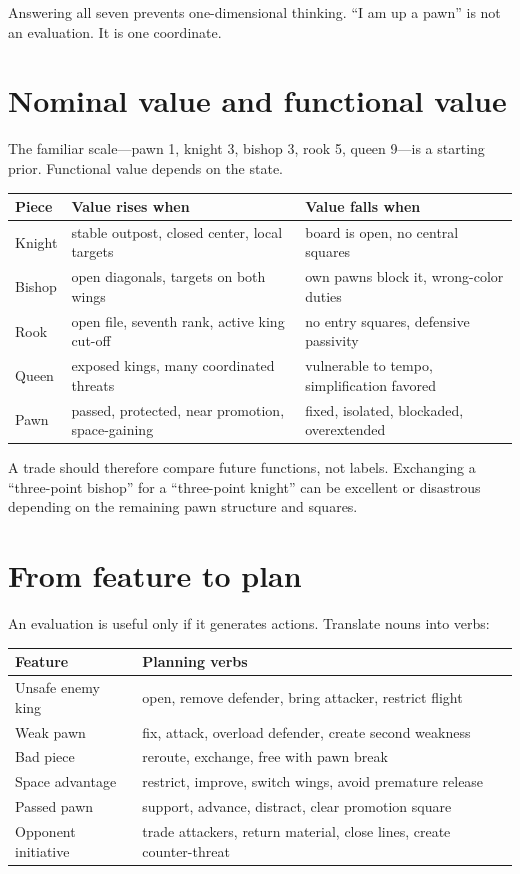Answering all seven prevents one-dimensional thinking. ``I am up a pawn'' is not an evaluation. It is one coordinate.

\section{Nominal value and functional value}
The familiar scale---pawn 1, knight 3, bishop 3, rook 5, queen 9---is a starting prior. Functional value depends on the state.

\begin{center}
\begin{tabularx}{.94\textwidth}{p{}YY}
\toprule
\textbf{Piece} & \textbf{Value rises when} & \textbf{Value falls when}\\
\midrule
Knight & stable outpost, closed center, local targets & board is open, no central squares\\
Bishop & open diagonals, targets on both wings & own pawns block it, wrong-color duties\\
Rook & open file, seventh rank, active king cut-off & no entry squares, defensive passivity\\
Queen & exposed kings, many coordinated threats & vulnerable to tempo, simplification favored\\
Pawn & passed, protected, near promotion, space-gaining & fixed, isolated, blockaded, overextended\\
\bottomrule
\end{tabularx}
\end{center}

A trade should therefore compare future functions, not labels. Exchanging a ``three-point bishop'' for a ``three-point knight'' can be excellent or disastrous depending on the remaining pawn structure and squares.

\section{From feature to plan}
An evaluation is useful only if it generates actions. Translate nouns into verbs:

\begin{center}
\begin{tabularx}{.9\textwidth}{YY}
\toprule
\textbf{Feature} & \textbf{Planning verbs}\\
\midrule
Unsafe enemy king & open, remove defender, bring attacker, restrict flight\\
Weak pawn & fix, attack, overload defender, create second weakness\\
Bad piece & reroute, exchange, free with pawn break\\
Space advantage & restrict, improve, switch wings, avoid premature release\\
Passed pawn & support, advance, distract, clear promotion square\\
Opponent initiative & trade attackers, return material, close lines, create counter-threat\\
\bottomrule
\end{tabularx}
\end{center}

